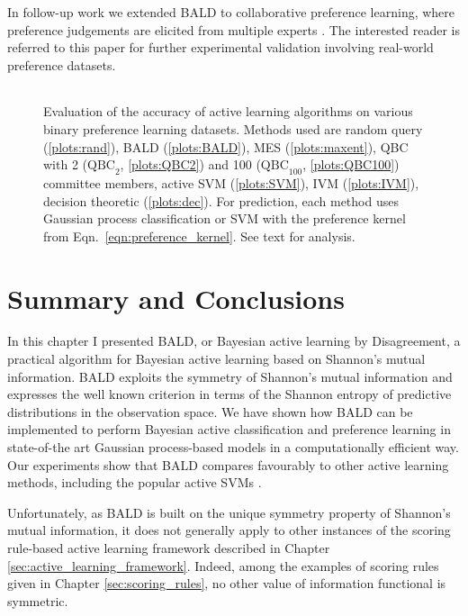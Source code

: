 In follow-up work we extended BALD to collaborative preference learning, where preference judgements are elicited from multiple experts \citep{Houlsby2012preference}. The interested reader is referred to this paper for further experimental validation involving real-world preference datasets.
% 
\begin{figure}
	\begin{center}
	\begin{tabular}{ccc}
	\end{tabular}
	\end{center}
	\caption[Evaluation of Bayesian active learning of binary preference relations]{Evaluation of the accuracy of active learning algorithms on various binary preference learning datasets. Methods used are random query (\ref{plots:rand}), BALD (\ref{plots:BALD}),  MES (\ref{plots:maxent}), QBC with 2 ($\mbox{QBC}_2$, \ref{plots:QBC2}) and 100 ($\mbox{QBC}_{100}$, \ref{plots:QBC100}) committee members, active SVM (\ref{plots:SVM}), IVM (\ref{plots:IVM}), decision theoretic \citep{Kapoor2007} (\ref{plots:dec}). For prediction, each method uses Gaussian process classification or SVM with the preference kernel from Eqn.\ \eqref{eqn:preference_kernel}.  See text for analysis. \label{fig:BALD_pref_results}}
\end{figure}

\section{Summary and Conclusions}

In this chapter I presented BALD, or Bayesian active learning by Disagreement, a practical algorithm for Bayesian active learning based on Shannon's mutual information. BALD exploits the symmetry of Shannon's mutual information and expresses the well known criterion in terms of the Shannon entropy of predictive distributions in the observation space. We have shown how BALD can be implemented to perform Bayesian active classification and preference learning in state-of-the art Gaussian process-based models in a computationally efficient way. Our experiments show that BALD compares favourably to other active learning methods, including the popular active SVMs \citep{Tong2001}.

Unfortunately, as BALD is built on the unique symmetry property of Shannon's mutual information, it does not generally apply to other instances of the scoring rule-based active learning framework described in Chapter \ref{sec:active_learning_framework}. Indeed, among the examples of scoring rules given in Chapter \ref{sec:scoring_rules}, no other value of information functional is symmetric.